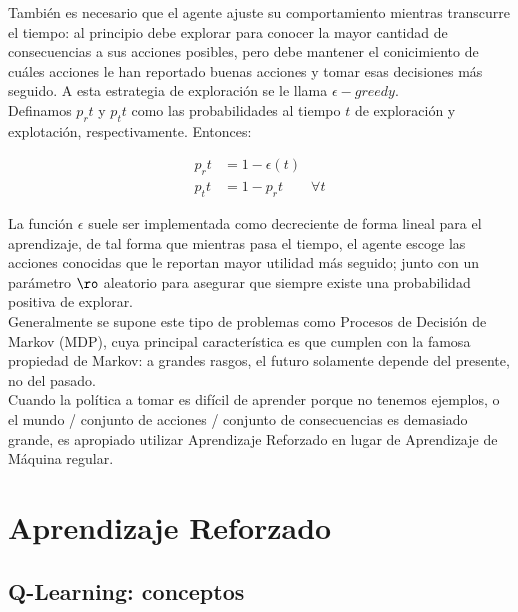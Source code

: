 
Tambi\'en es necesario que el agente ajuste su comportamiento mientras transcurre el tiempo: al principio debe explorar para conocer la mayor cantidad de consecuencias a sus acciones posibles, pero debe mantener el conicimiento de cu\'ales acciones le han reportado buenas acciones y tomar esas decisiones m\'as seguido. A esta estrategia de exploraci\'on se le llama $\epsilon-greedy$.\\

Definamos $p_r{t}$ y $p_t{t}$ como las probabilidades al tiempo $t$ de exploraci\'on y explotaci\'on, respectivamente. Entonces:

\vspace{-30pt}
\begin{align*}
p_r{t} &= 1 - \epsilon(t) \\
p_t{t} &= 1 - p_r{t} \quad \quad \forall t
\end{align*}

La funci\'on $\epsilon$ suele ser implementada como decreciente de forma lineal para el aprendizaje, de tal forma que mientras pasa el tiempo, el agente escoge las acciones conocidas que le reportan mayor utilidad m\'as seguido; junto con un par\'ametro $\ro$ aleatorio para asegurar que siempre existe una probabilidad positiva de explorar.\\

Generalmente se supone este tipo de problemas como Procesos de Decisi\'on de Markov (MDP), cuya principal caracter\'istica es que cumplen con la famosa propiedad de Markov: a grandes rasgos, el futuro solamente depende del presente, no del pasado.\\


Cuando la pol\'itica a tomar es dif\'icil de aprender porque no tenemos ejemplos, o el mundo / conjunto de acciones / conjunto de consecuencias es demasiado grande, es apropiado utilizar Aprendizaje Reforzado en lugar de Aprendizaje de M\'aquina regular.

\section{Aprendizaje Reforzado}

\subsection{Q-Learning: conceptos}

